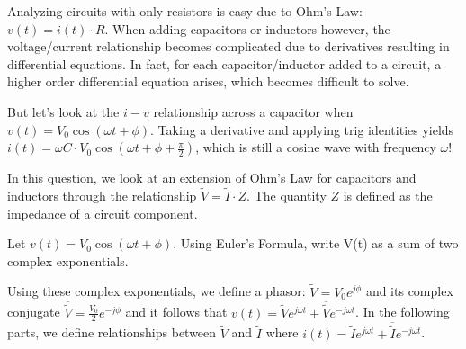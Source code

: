 
Analyzing circuits with only resistors is easy due to Ohm's Law: $v(t)=i(t) \cdot R$.
When adding capacitors or inductors however, the voltage/current relationship becomes complicated due to derivatives resulting in differential equations.
In fact, for each capacitor/inductor added to a circuit, a higher order differential equation arises, which becomes difficult to solve.

But let's look at the $i-v$ relationship across a capacitor when $v(t) = V_{0} \cos(\omega{} t+\phi{})$.
Taking a derivative and applying trig identities yields $i(t)=\omega C \cdot V_{0} \cos(\omega{} t + \phi{} + \frac{\pi{}}{2})$, 
which is still a cosine wave with frequency $\omega{}$!

In this question, we look at an extension of Ohm's Law for capacitors and inductors through the relationship $\widetilde{V} = \widetilde{I} \cdot Z$.
The quantity $Z$ is defined as the impedance of a circuit component.

\begin{enumerate}

\qitem Let $v(t) = V_{0} \cos(\omega{}t + \phi{})$.
Using Euler's Formula, write V(t) as a sum of two complex exponentials.


\end{enumerate}

Using these complex exponentials, we define a phasor: $\widetilde{V} = V_{0}e^{j\phi{}}$ and its complex conjugate $\overline{\widetilde{V}} = \frac{V_{0}}{2}e^{-j\phi{}}$ and it follows that $v(t) = \widetilde{V}e^{j\omega{}t} + \overline{\widetilde{V}}e^{-j\omega{}t}$.
In the following parts, we define relationships between $\widetilde{V}$ and $\widetilde{I}$ where $i(t) = \widetilde{I}e^{j\omega{}t} + \overline{\widetilde{I}}e^{-j\omega{}t}$.

